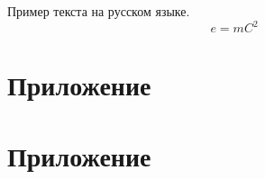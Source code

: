 \documentclass[draft,xelatex]{G7-32-2017}
\begin{document}
Пример текста на русском языке.
\begin{equation}
    \label{ex:eq:1}
    e = mC^2
\end{equation}

\backmatter

\Conclusion

\lipsum[1-5]

\appenmatter
\appendix

\chapter{Приложение}

\lipsum[3-5]

\chapter{Приложение}

\lipsum[1-2]




% 

% 





% 


% 


% 
% 
\end{document}
